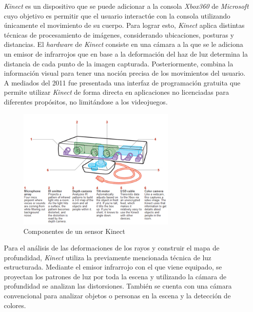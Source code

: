 \emph{Kinect} es un dispositivo que se puede adicionar a la consola \emph{Xbox360} de \emph{Microsoft} cuyo objetivo es permitir que el usuario interactúe con la consola utilizando únicamente el movimiento de su cuerpo. Para lograr esto, \emph{Kinect} aplica distintas técnicas de procesamiento de imágenes, considerando ubicaciones, posturas y distancias. El \emph{hardware} de \emph{Kinect} consiste en una cámara a la que se le adiciona un emisor de infrarrojos que en base a la deformación del haz de luz determina la distancia de cada punto de la imagen capturada. Posteriormente, combina la información visual para tener una noción precisa de los movimientos del usuario. A mediados del 2011 fue presentada una interfaz de programación gratuita que permite utilizar \emph{Kinect} de forma directa en aplicaciones no licenciadas para diferentes propósitos, no limitándose a los videojuegos.

\begin{figure}[H]
  \centering
    \includegraphics[width=0.7\textwidth]{./Cap2_videomapping/kinect.PNG}
  \caption{Componentes de un sensor Kinect}
  \label{fig:Kinect}
\end{figure}

Para el análisis de las deformaciones de los rayos y construir el mapa de profundidad, \emph{Kinect} utiliza la previamente mencionada técnica de luz estructurada. Mediante el emisor infrarrojo con el que viene equipado, se proyectan los patrones de luz por toda la escena y utilizando la cámara de profundidad se analizan las distorsiones.
También se cuenta con una cámara convencional para analizar objetos o personas en la escena y la detección de colores.

